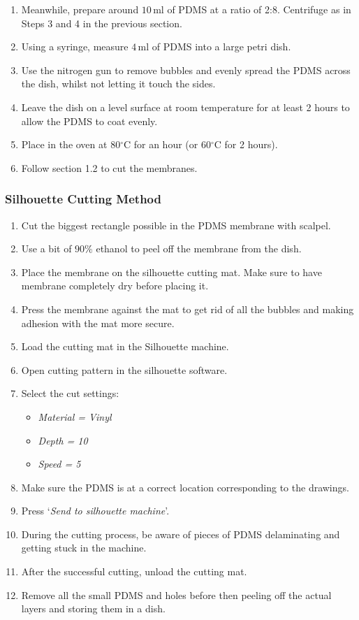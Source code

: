 \begin{enumerate}
	 \setlength\itemsep{-0.1em}
	\item Meanwhile, prepare around $10 \, \text{ml}$ of PDMS at a ratio of 2:8. Centrifuge as in Steps 3 and 4 in the previous section.
	\item Using a syringe, measure $4 \, \text{ml}$ of PDMS into a large petri dish.
	\item Use the nitrogen gun to remove bubbles and evenly spread the PDMS across the dish, whilst not letting it touch the sides.
	\item Leave the dish on a level surface at room temperature for at least 2 hours to allow the PDMS to coat evenly.
	\item Place in the oven at 80$^{\circ}$C for an hour (or 60$^{\circ}$C for 2 hours).
	\item Follow section 1.2 to cut the membranes.
\end{enumerate}

\subsubsection{Silhouette Cutting Method}

\begin{enumerate}
		 \setlength\itemsep{-0.1em}
	\setcounter{enumi}{6}
	\item Cut the biggest rectangle possible in the PDMS membrane with scalpel.
	\item Use a bit of $90\%$ ethanol to peel off the membrane from the dish.
	\item Place the membrane on the silhouette cutting mat. Make sure to have membrane completely dry before placing it.
	\item Press the membrane against the mat to get rid of all the bubbles and making adhesion with the mat more secure.
	\item Load the cutting mat in the Silhouette machine.
	\item Open cutting pattern in the silhouette software.
	\item Select the cut settings:
	\begin{itemize}
			 \setlength\itemsep{-0.1em}
		\item \textit{Material = Vinyl}
		\item \textit{Depth = 10}
		\item \textit{Speed = 5}
	\end{itemize}
	\item Make sure the PDMS is at a correct location corresponding to the drawings.
	\item Press `\textit{Send to silhouette machine}'.
	\item During the cutting process, be aware of pieces of PDMS delaminating and getting stuck in the machine.
	\item After the successful cutting, unload the cutting mat.
	\item Remove all the small PDMS and holes before then peeling off the actual layers and storing them in a dish.
\end{enumerate}

